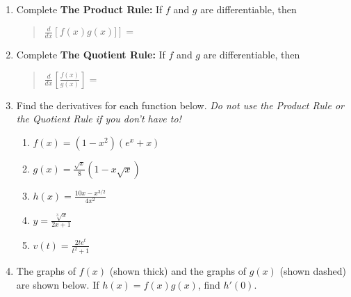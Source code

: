 \documentclass[11pt,fleqn]{article}
\begin{document}
\setlength{\parindent}{0cm}
\renewcommand{\headrulewidth}{0pt}
\newcommand{\blank}[1]{\rule{#1}{0.75pt}}
\renewcommand{\d}{\displaystyle}
\vspace*{-0.7in}
\begin{center}
 {\large{ }}
\end{center}
\begin{enumerate}

\item Complete \textbf{The Product Rule:} If $f$ and $g$ are differentiable, then 
\begin{quote}  $\d{\frac{d}{dx} \left[f(x) g(x)]\right] =} $ \end{quote}
\vspace{.2in}

\item Complete \textbf{The Quotient Rule:}  If $f$ and $g$ are differentiable, then
\begin{quote} 
$\frac{d}{dx} \left[ \frac{f(x)}{g(x)} \right] = $ \end{quote}
\vspace{.2in}
\item Find the derivatives for each function below. \emph{Do not use the Product Rule or the Quotient Rule  if you don't have to!}
	\begin{enumerate}
	\item $\d{f(x)=(1-x^2)(e^x+x)}$
	\vfill
	\item $\d{g(x)=\frac{\sqrt{x}}{8}(1-x\sqrt{x})}$
	\vfill
	\item $\d{h(x)=\frac{10x-x^{3/2}}{4x^2}}$
	\vfill
	\newpage
	\item $\d{y=\frac{\sqrt[3]{x}}{2x+1}}$
	\vfill
	\item $\d{v(t)=\frac{2te^t}{t^2+1}}$
	\vfill
	\end{enumerate}
\item   The graphs of $f(x)$ (shown thick) and the graphs of $g(x)$ (shown dashed) are shown below. If $h(x) = f(x)g(x)$, find $h'(0)$.

  \begin{flushleft}


\end{flushleft}
\end{enumerate}
\end{document}
